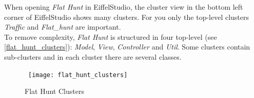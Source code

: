 When opening \emph{Flat Hunt} in EiffelStudio, the cluster view in the bottom left corner of EiffelStudio shows many clusters. For you only the top-level clusters \emph{Traffic} and \emph{Flat\_hunt} are important.\\

To remove complexity, \emph{Flat Hunt} is structured in four top-level (see \autoref{flat_hunt_clusters}): \emph{Model}, \emph{View}, \emph{Controller} and \emph{Util}. Some clusters contain sub-clusters and in each cluster there are several classes.

\begin{figure}[h]
\centerline{\hbox{  
  \texttt{[image: flat\_hunt\_clusters]}
  }}
\caption{Flat Hunt Clusters}
\label{flat_hunt_clusters}
\end{figure}
